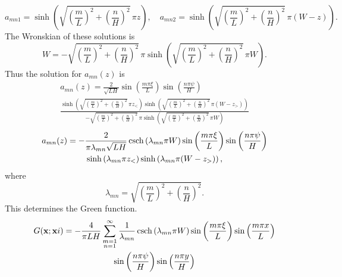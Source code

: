 {\begin{Solution}
\begin{enumerate}
    \[
    a_{m n 1} = \sinh \left( \sqrt{ \left( \frac{ m }{ L } \right)^2 
        + \left( \frac{ n }{ H } \right)^2 } \, \pi z \right), \quad
    a_{m n 2} = \sinh \left( \sqrt{ \left( \frac{ m }{ L } \right)^2 
        + \left( \frac{ n }{ H } \right)^2 } \, \pi (W-z) \right).
    \]
    The Wronskian of these solutions is
    \[
    W = - \sqrt{ \left( \frac{ m }{ L } \right)^2 
      + \left( \frac{ n }{ H } \right)^2 } \, \pi 
    \sinh \left( \sqrt{ \left( \frac{ m }{ L } \right)^2 
        + \left( \frac{ n }{ H } \right)^2 } \, \pi W \right).
    \]
    Thus the solution for $a_{m n}(z)$ is
    \begin{multline*}
      a_{m n}(z) = \frac{2}{\sqrt{L H} }
      \sin \left( \frac{ m \pi \xi }{ L } \right)
      \sin \left( \frac{ n \pi \psi }{ H } \right) 
      \\
      \frac{ \sinh \left( \sqrt{ \left( \frac{ m }{ L } \right)^2 
            + \left( \frac{ n }{ H } \right)^2 } \, \pi z_< \right)
        \sinh \left( \sqrt{ \left( \frac{ m }{ L } \right)^2 
            + \left( \frac{ n }{ H } \right)^2 } \, \pi (W-z_>) \right) }
      { - \sqrt{ \left( \frac{ m }{ L } \right)^2 
          + \left( \frac{ n }{ H } \right)^2 } \, \pi 
        \sinh \left( \sqrt{ \left( \frac{ m }{ L } \right)^2 
            + \left( \frac{ n }{ H } \right)^2 } \, \pi W \right) }
    \end{multline*}
    \begin{multline*}
      a_{m n}(z) = - \frac{2}{ \pi \lambda_{m n} \sqrt{L H} }
      \mathop{\mathrm{csch}}\nolimits \left( \lambda_{m n} \pi W \right)
      \sin \left( \frac{ m \pi \xi }{ L } \right)
      \sin \left( \frac{ n \pi \psi }{ H } \right) 
      \\
      \sinh \left( \lambda_{m n} \pi z_< \right)
      \sinh \left( \lambda_{m n} \pi (W-z_>) \right),
    \end{multline*}
    where
    \[
    \lambda_{m n} = \sqrt{ \left( \frac{ m }{ L } \right)^2 
      + \left( \frac{ n }{ H } \right)^2 }.
    \]
    This determines the Green function.
    \begin{multline*}
      G(\mathbf{x}; \mathbf{x}i) = - \frac{4}{ \pi L H }
      \sum_{\substack{m=1\\n=1}}^\infty
      \frac{1}{ \lambda_{m n} }
      \csch \left( \lambda_{m n} \pi W \right)
      \sin \left( \frac{ m \pi \xi }{ L } \right)
      \sin \left( \frac{ m \pi x }{ L } \right) 
      \\
      \sin \left( \frac{ n \pi \psi }{ H } \right)
      \sin \left( \frac{ n \pi y }{ H } \right)

\end{multline*}
\end{enumerate}
\end{Solution}}
